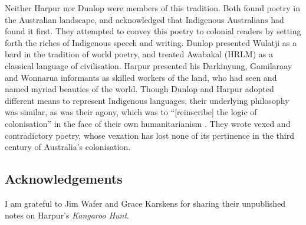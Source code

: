 \documentclass[
  Crown,
  times,
  sageh]{sagej}
\begin{document}
Neither Harpur nor Dunlop were members of this tradition. Both found
poetry in the Australian landscape, and acknowledged that Indigenous
Australians had found it first. They attempted to convey this poetry to
colonial readers by setting forth the riches of Indigenous speech and
writing. Dunlop presented Wulatji as a bard in the tradition of world
poetry, and treated Awabakal (HRLM) as a classical language of
civilisation. Harpur presented his Darkinyung, Gamilaraay and Wonnarua
informants as skilled workers of the land, who had seen and named myriad
beauties of the world. Though Dunlop and Harpur adopted different means
to represent Indigenous languages, their underlying philosophy was
similar, as was their agony, which was to ``{[}reinscribe{]} the logic
of colonisation'' in the face of their own humanitarianism
\citep[113]{minter_settlement_2021}. They wrote vexed and contradictory
poetry, whose vexation has lost none of its pertinence in the third
century of Australia's colonisation.

\subsection{Acknowledgements}\label{acknowledgements}

I am grateful to Jim Wafer and Grace Karskens for sharing their
unpublished notes on Harpur's \emph{Kangaroo Hunt}.


\end{document}
